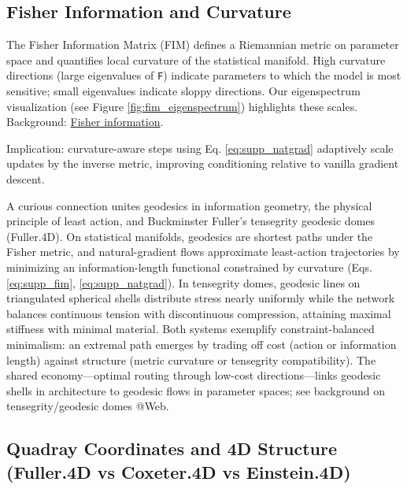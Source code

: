 \documentclass[
  10pt,
]{article}
\begin{document}
\hypertarget{fisher-information-and-curvature}{%
\subsection{Fisher Information and
Curvature}\label{fisher-information-and-curvature}}

The Fisher Information Matrix (FIM) defines a Riemannian metric on
parameter space and quantifies local curvature of the statistical
manifold. High curvature directions (large eigenvalues of \texttt{F})
indicate parameters to which the model is most sensitive; small
eigenvalues indicate sloppy directions. Our eigenspectrum visualization
(see Figure \ref{fig:fim_eigenspectrum}) highlights these scales.
Background:
\href{https://en.wikipedia.org/wiki/Fisher_information}{Fisher
information}.

Implication: curvature-aware steps using Eq. \eqref{eq:supp_natgrad}
adaptively scale updates by the inverse metric, improving conditioning
relative to vanilla gradient descent.

A curious connection unites geodesics in information geometry, the
physical principle of least action, and Buckminster Fuller's tensegrity
geodesic domes (Fuller.4D). On statistical manifolds, geodesics are
shortest paths under the Fisher metric, and natural-gradient flows
approximate least-action trajectories by minimizing an
information-length functional constrained by curvature (Eqs.
\eqref{eq:supp_fim}, \eqref{eq:supp_natgrad}). In tensegrity domes,
geodesic lines on triangulated spherical shells distribute stress nearly
uniformly while the network balances continuous tension with
discontinuous compression, attaining maximal stiffness with minimal
material. Both systems exemplify constraint-balanced minimalism: an
extremal path emerges by trading off cost (action or information length)
against structure (metric curvature or tensegrity compatibility). The
shared economy---optimal routing through low-cost directions---links
geodesic shells in architecture to geodesic flows in parameter spaces;
see background on tensegrity/geodesic domes @Web.

\hypertarget{quadray-coordinates-and-4d-structure-fuller.4d-vs-coxeter.4d-vs-einstein.4d}{%
\subsection{Quadray Coordinates and 4D Structure (Fuller.4D vs
Coxeter.4D vs
Einstein.4D)}\label{quadray-coordinates-and-4d-structure-fuller.4d-vs-coxeter.4d-vs-einstein.4d}}
\end{document}
